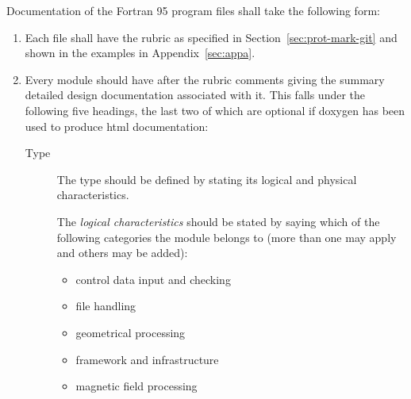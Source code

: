 \documentclass[11pt,twoside,a4paper]{report}
\begin{document}
Documentation of the Fortran 95 program files shall take the following
form:
\begin{enumerate}
\item Each file shall have the rubric as
  specified in Section~\ref{sec:prot-mark-git} and shown in the
  examples in Appendix~\ref{sec:appa}.
\item Every module should have after the rubric comments giving the
  summary detailed design documentation associated with it. This falls
  under the following five headings, the last two of which are optional
  if doxygen has been used to produce html documentation:
  \begin{description}
  \item[Type]
 The type should be defined by stating its logical and physical
 characteristics.

 The \emph{logical characteristics} should be stated by saying which of the
 following categories the module belongs to (more than one may apply and
 others may be added):
 \begin{itemize}
    \item control data input and checking
    \item file handling
    \item geometrical processing
    \item framework and infrastructure
    \item magnetic field processing
 \end{itemize}


\end{description}
\end{enumerate}
\end{document}
